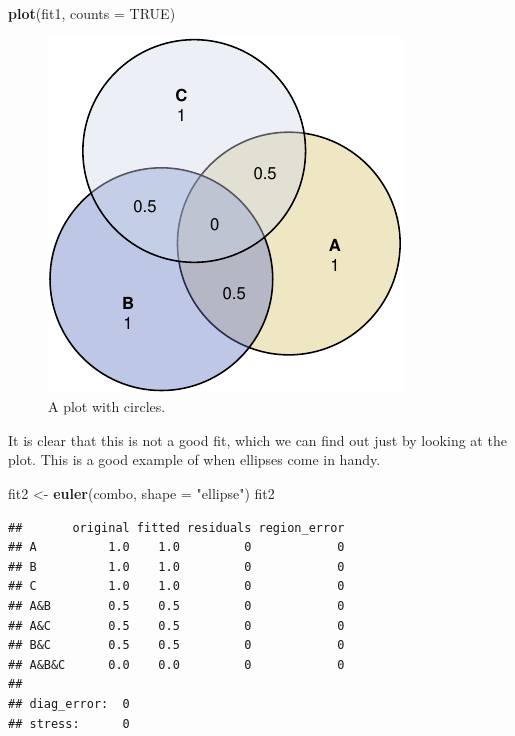 \documentclass[
  headsepline=true,headings=standardclasses%
]{scrartcl}
\newenvironment{Shaded}{\begin{snugshade}}{\end{snugshade}}
\newcommand{\KeywordTok}[1]{\textcolor[rgb]{0.13,0.29,0.53}{\textbf{#1}}}
\newcommand{\DataTypeTok}[1]{\textcolor[rgb]{0.13,0.29,0.53}{#1}}
\newcommand{\StringTok}[1]{\textcolor[rgb]{0.31,0.60,0.02}{#1}}
\newcommand{\OtherTok}[1]{\textcolor[rgb]{0.56,0.35,0.01}{#1}}
\newcommand{\NormalTok}[1]{#1}
\theoremstyle{definition}
\theoremstyle{definition}
\theoremstyle{remark}
\begin{document}
\begin{Shaded}
\begin{Highlighting}[]
\KeywordTok{plot}\NormalTok{(fit1, }\DataTypeTok{counts =} \OtherTok{TRUE}\NormalTok{)}
\end{Highlighting}
\end{Shaded}

\begin{figure}
\centering
\includegraphics{thesis_files/figure-latex/unnamed-chunk-8-1.pdf}
\caption{\label{fig:unnamed-chunk-8}A plot with circles.}
\end{figure}

It is clear that this is not a good fit, which we can find out just by
looking at the plot. This is a good example of when ellipses come in
handy.

\begin{Shaded}
\begin{Highlighting}[]
\NormalTok{fit2 <-}\StringTok{ }\KeywordTok{euler}\NormalTok{(combo, }\DataTypeTok{shape =} \StringTok{"ellipse"}\NormalTok{)}
\NormalTok{fit2}
\end{Highlighting}
\end{Shaded}

\begin{verbatim}
##       original fitted residuals region_error
## A          1.0    1.0         0            0
## B          1.0    1.0         0            0
## C          1.0    1.0         0            0
## A&B        0.5    0.5         0            0
## A&C        0.5    0.5         0            0
## B&C        0.5    0.5         0            0
## A&B&C      0.0    0.0         0            0
## 
## diag_error:  0 
## stress:      0
\end{verbatim}
\end{document}
